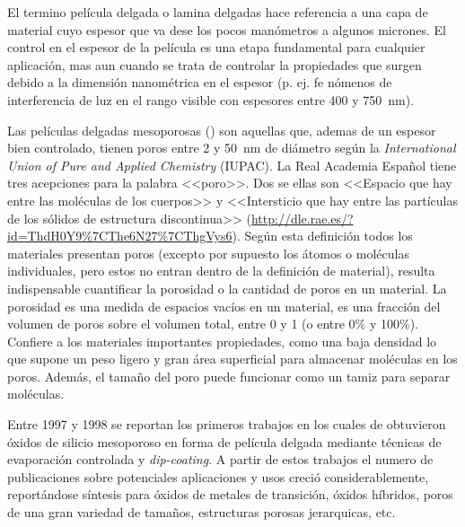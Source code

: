 
	El termino película delgada o lamina delgadas hace referencia a una capa de material cuyo espesor que va dese los pocos manómetros a algunos micrones. El control en el espesor de la película es una etapa fundamental para cualquier aplicación, mas aun cuando se trata de controlar la propiedades que surgen debido a la dimensión nanométrica en el espesor (p. ej. fe nómenos de interferencia de luz en el rango visible con espesores entre 400 y \SI{750}{\nm}). 

	Las películas delgadas mesoporosas (\pdm) son aquellas que, ademas de un espesor bien controlado, tienen poros entre 2 y \SI{50}{\nm} de diámetro según la  \textit{International Union of Pure and Applied Chemistry} (IUPAC)\cite{iupac-1994}. La Real Academia Español tiene tres acepciones para la palabra <<poro>>. Dos se ellas son <<Espacio que hay entre las moléculas de los cuerpos>> y <<Intersticio que hay entre las partículas de los sólidos de estructura discontinua>> (\url{http://dle.rae.es/?id=ThdH0Y9%7CThe6N27%7CThgVys6}). Según esta definición todos los materiales presentan poros (excepto por supuesto los átomos o moléculas individuales, pero estos no entran dentro de la definición de material), resulta indispensable cuantificar la porosidad\index{porosidad} o la cantidad de poros en un material. La porosidad\index{porosidad} es una medida de espacios vacíos en un material, es una fracción del volumen de poros sobre el volumen total, entre 0 y 1 (o entre 0\% y 100\%).\cite{iupac-1994} Confiere a los materiales importantes propiedades, como una baja densidad lo que supone un peso ligero y gran área superficial para almacenar moléculas en los poros. Además, el tamaño del poro\index{poro} puede funcionar como un tamiz para separar moléculas.\cite{Martin2004} 


	Entre 1997 y 1998 se reportan los primeros trabajos en los cuales de obtuvieron óxidos de silicio mesoporoso en forma de película delgada mediante técnicas de evaporación controlada y \textit{dip-coating}.\cite{Lu1997,Zhao1998a,Zhao1998,Brinker1999} A partir de estos trabajos el numero de publicaciones sobre potenciales aplicaciones y usos creció considerablemente, reportándose síntesis para óxidos de metales de transición\cite{Ciesla1996,Ulagappan1996,Antonelli1995}, óxidos híbridos, poros de una gran variedad de tamaños, estructuras porosas jerarquicas, etc.\cite{Soler-Illia2006,Moller1998}

